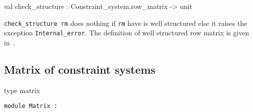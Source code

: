 \begin{ocamldocsigend}
\label{val:Constraint-underscoresystem.Row.check-underscorestructure}\begin{ocamldoccode}
val check_structure : Constraint_system.row_matrix -> unit
\end{ocamldoccode}
\begin{ocamldocdescription}
{\tt{check\_structure rm}} does nothing if {\tt{rm}} have is well structured else it raises 
      the exception {\tt{Internal\_error}}. The definition of well structured row matrix is given in~. 


\end{ocamldocdescription}
\end{ocamldocsigend}






\subsection{Matrix of constraint systems}




\label{type:Constraint-underscoresystem.matrix}\begin{ocamldoccode}
type matrix 
\end{ocamldoccode}




\begin{ocamldoccode}
{\tt{module }}{\tt{Matrix}}{\tt{ : }}\end{ocamldoccode}
\label{module:Constraint-underscoresystem.Matrix}

